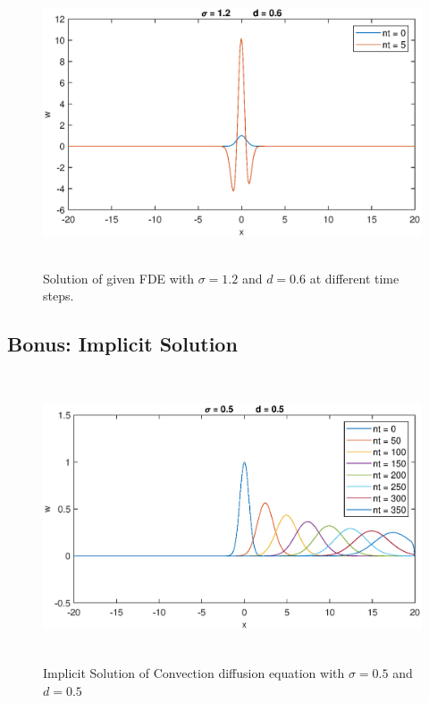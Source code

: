 \documentclass[letterpaper,12pt]{article}
\begin{document}
\begin{figure}[!h] 
	\centering 
	\includegraphics[max height=8.5cm]{graphs/Question4/sigma12d06.eps}
	\caption{Solution of given FDE with $\sigma= 1.2$ and $d=0.6$ at different time steps.}
	\label{fig:Q4_3}
\end{figure}

\newpage

\subsection{Bonus: Implicit Solution}

\begin{figure}[!h] 
	\centering 
	\includegraphics[max height=8.5cm]{graphs/Bonus/sigma05d05.eps}
	\caption{Implicit Solution of Convection diffusion equation with $\sigma= 0.5$ and $d=0.5$}
	\label{fig:b_1}
\end{figure}

\vspace{1cm}
\end{document}
